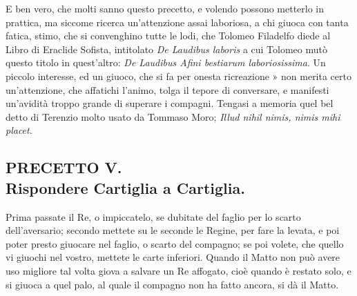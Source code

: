 \documentclass[11pt,a6paper]{article}
\begin{document}
E ben vero, che molti sanno questo precetto,
e volendo possono metterlo in prattica,
ma siccome ricerca un'attenzione assai
laboriosa, a chi giuoca con tanta fatica, stimo,
che si convenghino tutte le lodi, che Tolomeo
Filadelfo diede al Libro di Eraclide Sofista,
intitolato \textit{De Laudibus laboris} a cui Tolomeo
mutò questo titolo in quest'altro: \textit{De Laudibus
  Afini bestiarum laboriosissima}. Un piccolo
interesse, ed un giuoco, che si fa per
onesta ricreazione » non merita certo
un'attenzione, che affatichi l'animo, tolga il
tepore di conversare, e manifesti un'avidità
troppo grande di superare i compagni. Tengasi
a memoria quel bel detto di Terenzio
molto usato da Tommaso Moro; \textit{Illud nihil
nimis, nimis mihi placet}.


\subsection{PRECETTO V.\\
 \footnotesize Rispondere Cartiglia a Cartiglia.}

Prima passate il Re, o impiccatelo, se
dubitate del faglio per lo scarto dell'aversario;
secondo mettete su le seconde le
Regine, per fare la levata, e poi poter presto
giuocare nel faglio, o scarto del compagno;
se poi volete, che quello vi giuochi nel
vostro, mettete le carte inferiori. Quando il
Matto non può avere uso migliore tal volta
giova a salvare un Re affogato, cioè quando
è restato solo, e si giuoca a quel palo, al
quale il compagno non ha fatto ancora, si dà il Matto.
\end{document}
